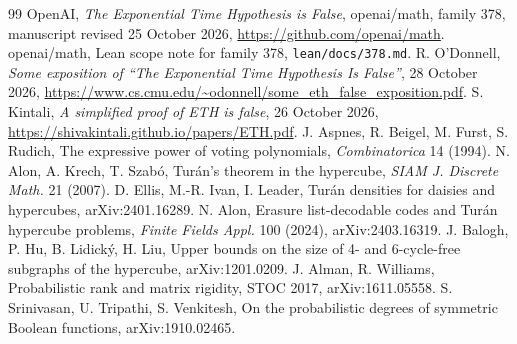 \documentclass[11pt]{article}
\theoremstyle{definition}
\theoremstyle{remark}
\begin{document}
\begin{thebibliography}{99}\small
{} OpenAI, \emph{The Exponential Time Hypothesis is False}, openai/math, family 378, manuscript revised 25 October 2026, \url{https://github.com/openai/math}.
 openai/math, Lean scope note for family 378, \texttt{lean/docs/378.md}.
 R. O'Donnell, \emph{Some exposition of ``The Exponential Time Hypothesis Is False''}, 28 October 2026, \url{https://www.cs.cmu.edu/~odonnell/some_eth_false_exposition.pdf}.
 S. Kintali, \emph{A simplified proof of ETH is false}, 26 October 2026, \url{https://shivakintali.github.io/papers/ETH.pdf}.
 J. Aspnes, R. Beigel, M. Furst, S. Rudich, The expressive power of voting polynomials, \emph{Combinatorica} 14 (1994).
 N. Alon, A. Krech, T. Szab\'o, Tur\'an's theorem in the hypercube, \emph{SIAM J. Discrete Math.} 21 (2007).
 D. Ellis, M.-R. Ivan, I. Leader, Tur\'an densities for daisies and hypercubes, arXiv:2401.16289.
 N. Alon, Erasure list-decodable codes and Tur\'an hypercube problems, \emph{Finite Fields Appl.} 100 (2024), arXiv:2403.16319.
 J. Balogh, P. Hu, B. Lidick\'y, H. Liu, Upper bounds on the size of 4- and 6-cycle-free subgraphs of the hypercube, arXiv:1201.0209.
 J. Alman, R. Williams, Probabilistic rank and matrix rigidity, STOC 2017, arXiv:1611.05558.
 S. Srinivasan, U. Tripathi, S. Venkitesh, On the probabilistic degrees of symmetric Boolean functions, arXiv:1910.02465.
\end{thebibliography}
\end{document}
